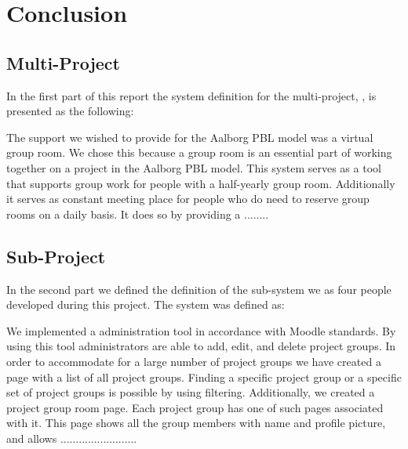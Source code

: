 \chapter{Conclusion}
\label{chap:conclusion}
\section{Multi-Project}
\label{sec:multiconclusion}
In the first part of this report the system definition for the multi-project, \system{}, is presented as the following: 


The support we wished to provide for the Aalborg PBL model was a virtual group room.
We chose this because a group room is an essential part of working together on a project in the Aalborg PBL model.
This system serves as a tool that supports group work for people with a half-yearly group room.
Additionally it serves as constant meeting place for people who do need to reserve group rooms on a daily basis.
It does so by providing a ........ %


\section{Sub-Project}
\label{sec:subconclusion}

In the second part we defined the definition of the sub-system we as four people developed during this project.
The system was defined as:

\begin{center}
\end{center}

We implemented a administration tool in accordance with Moodle standards.
By using this tool administrators are able to add, edit, and delete project groups.
In order to accommodate for a large number of project groups we have created a page with a list of all project groups.
Finding a specific project group or a specific set of project groups is possible by using filtering.
Additionally, we created a project group room page.
Each project group has one of such pages associated with it.
This page shows all the group members with name and profile picture, and allows .........................